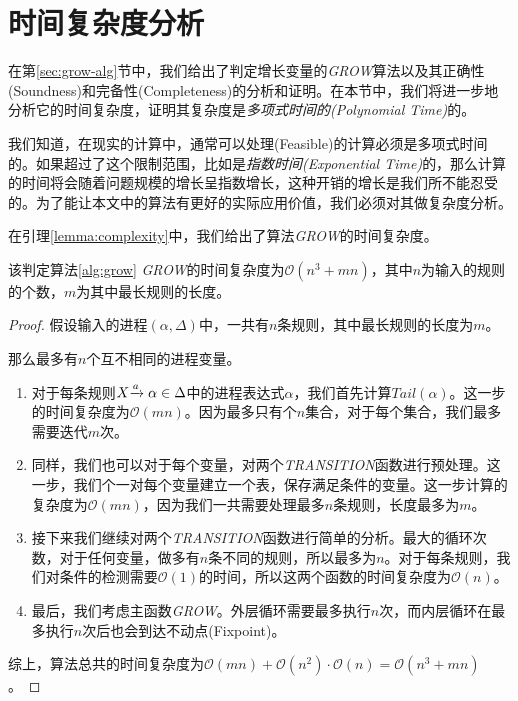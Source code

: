 \section{时间复杂度分析}
\label{sec:complexity}

在第\ref{sec:grow-alg}节中，我们给出了判定增长变量的\textsl{GROW}算法以及其正确性(Soundness)和完备性(Completeness)的分析和证明。在本节中，我们将进一步地分析它的时间复杂度，证明其复杂度是\emph{多项式时间的(Polynomial Time)}的。

我们知道，在现实的计算中，通常可以处理(Feasible)的计算必须是多项式时间的。如果超过了这个限制范围，比如是\emph{指数时间(Exponential Time)}的，那么计算的时间将会随着问题规模的增长呈指数增长，这种开销的增长是我们所不能忍受的。为了能让本文中的算法有更好的实际应用价值，我们必须对其做复杂度分析。

在引理\ref{lemma:complexity}中，我们给出了算法\textsl{GROW}的时间复杂度。

\begin{lem}\label{lemma:complexity}
该判定算法\ref{alg:grow} \textsl{GROW}的时间复杂度为$\mathcal{O}(n^3+mn)$，其中$n$为输入的规则的个数，$m$为其中最长规则的长度。
\end{lem}

\begin{proof}

假设输入的进程$(\alpha,\Delta)$中，一共有$n$条规则，其中最长规则的长度为$m$。

那么最多有$n$个互不相同的进程变量。
\begin{enumerate}

\item 对于每条规则$X{\xrightarrow{a}{}}\alpha\in\Delta$中的进程表达式$\alpha$，我们首先计算$Tail(\alpha)$。这一步的时间复杂度为$\mathcal{O}(mn)$。因为最多只有个$n$集合，对于每个集合，我们最多需要迭代$m$次。

\item 同样，我们也可以对于每个变量，对两个\textsl{TRANSITION}函数进行预处理。这一步，我们个一对每个变量建立一个表，保存满足条件的变量。这一步计算的复杂度为$\mathcal{O}(mn)$，因为我们一共需要处理最多$n$条规则，长度最多为$m$。

\item 接下来我们继续对两个\textsl{TRANSITION}函数进行简单的分析。最大的循环次数，对于任何变量，做多有$n$条不同的规则，所以最多为$n$。对于每条规则，我们对条件的检测需要$\mathcal{O}(1)$的时间，所以这两个函数的时间复杂度为$\mathcal{O}(n)$。

\item 最后，我们考虑主函数\textsl{GROW}。外层循环需要最多执行$n$次，而内层循环在最多执行$n$次后也会到达不动点(Fixpoint)。

\end{enumerate}
综上，算法总共的时间复杂度为$\mathcal{O}(mn)+\mathcal{O}(n^{2})\cdot \mathcal{O}(n)=\mathcal{O}(n^3+mn)$。
\end{proof}

